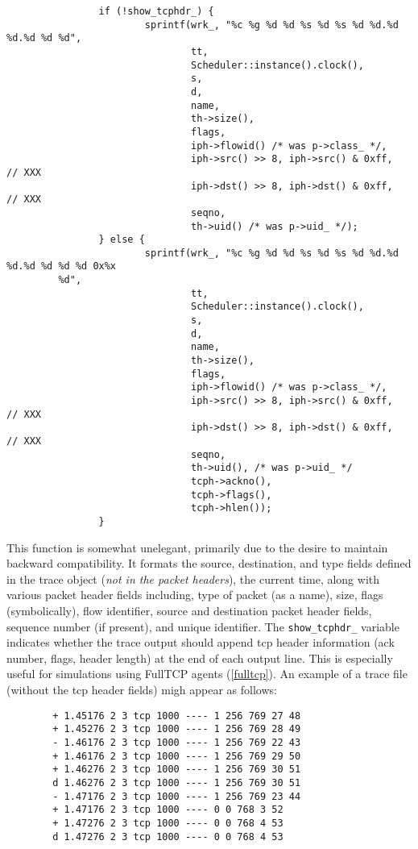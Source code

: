\begin{small}
\begin{verbatim}
                if (!show_tcphdr_) {
                        sprintf(wrk_, "%c %g %d %d %s %d %s %d %d.%d %d.%d %d %d",
                                tt,
                                Scheduler::instance().clock(),
                                s,
                                d,
                                name,
                                th->size(),
                                flags,
                                iph->flowid() /* was p->class_ */,
                                iph->src() >> 8, iph->src() & 0xff,     // XXX
                                iph->dst() >> 8, iph->dst() & 0xff,     // XXX
                                seqno,
                                th->uid() /* was p->uid_ */);
                } else {
                        sprintf(wrk_, "%c %g %d %d %s %d %s %d %d.%d %d.%d %d %d %d 0x%x
         %d",
                                tt,
                                Scheduler::instance().clock(),
                                s,
                                d,
                                name,
                                th->size(),
                                flags,
                                iph->flowid() /* was p->class_ */,
                                iph->src() >> 8, iph->src() & 0xff,     // XXX
                                iph->dst() >> 8, iph->dst() & 0xff,     // XXX
                                seqno,
                                th->uid(), /* was p->uid_ */
                                tcph->ackno(),
                                tcph->flags(),
                                tcph->hlen());
                }

\end{verbatim}
\end{small}
This function is somewhat unelegant, primarily due to the desire
to maintain backward compatibility.
It formats the source, destination, and type fields defined in the
trace object ({\em not in the packet headers}), the current time,
along with various packet header fields including,
type of packet (as a name), size, flags (symbolically),
flow identifier, source and destination packet header fields,
sequence number (if present), and unique identifier.
The {\tt show\_tcphdr\_} variable indicates whether the trace
output should append tcp header information (ack number, flags, header length)
at the end of each output line.  This is especially useful for simulations
using FullTCP agents (\ref{fulltcp}).
An example of a trace file (without the tcp header fields) migh
appear as follows: 
\begin{small}
\begin{verbatim}
        + 1.45176 2 3 tcp 1000 ---- 1 256 769 27 48
        + 1.45276 2 3 tcp 1000 ---- 1 256 769 28 49
        - 1.46176 2 3 tcp 1000 ---- 1 256 769 22 43
        + 1.46176 2 3 tcp 1000 ---- 1 256 769 29 50
        + 1.46276 2 3 tcp 1000 ---- 1 256 769 30 51
        d 1.46276 2 3 tcp 1000 ---- 1 256 769 30 51
        - 1.47176 2 3 tcp 1000 ---- 1 256 769 23 44
        + 1.47176 2 3 tcp 1000 ---- 0 0 768 3 52
        + 1.47276 2 3 tcp 1000 ---- 0 0 768 4 53
        d 1.47276 2 3 tcp 1000 ---- 0 0 768 4 53
\end{verbatim}
\end{small}
